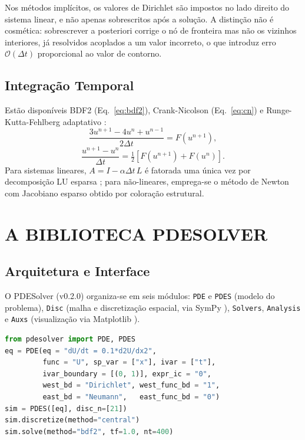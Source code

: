 \documentclass[10pt,brazil,english]{article}
\begin{document}
Nos métodos implícitos, os valores de Dirichlet são impostos no lado direito do sistema linear, e não apenas sobrescritos após a solução. A distinção não é cosmética: sobrescrever a posteriori corrige o nó de fronteira mas não os vizinhos interiores, já resolvidos acoplados a um valor incorreto, o que introduz erro $\mathcal{O}(\Delta t)$ proporcional ao valor de contorno.

\subsection{Integração Temporal}

Estão disponíveis BDF2 (Eq.~\ref{eq:bdf2}), Crank-Nicolson (Eq.~\ref{eq:cn}) e Runge-Kutta-Fehlberg adaptativo \cite{fehlberg1969}:
\begin{equation}
  \frac{3u^{n+1} - 4u^n + u^{n-1}}{2\Delta t} = F(u^{n+1}),
  \label{eq:bdf2}
\end{equation}
\begin{equation}
  \frac{u^{n+1} - u^n}{\Delta t} = \tfrac{1}{2}\left[F(u^{n+1}) + F(u^n)\right].
  \label{eq:cn}
\end{equation}
Para sistemas lineares, $A = I - \alpha \Delta t\, L$ é fatorada uma única vez por decomposição LU esparsa \cite{SciPy2020}; para não-lineares, emprega-se o método de Newton com Jacobiano esparso obtido por coloração estrutural.

\section{A BIBLIOTECA PDESOLVER}

\subsection{Arquitetura e Interface}

O PDESolver (v0.2.0) organiza-se em seis módulos: \texttt{PDE} e \texttt{PDES} (modelo do problema), \texttt{Disc} (malha e discretização espacial, via SymPy \cite{meurer2017}), \texttt{Solvers}, \texttt{Analysis} e \texttt{Auxs} (visualização via Matplotlib \cite{hunter2007}).

\begin{lstlisting}[float=htb, showstringspaces=false, language=Python]
from pdesolver import PDE, PDES
eq = PDE(eq = "dU/dt = 0.1*d2U/dx2",
         func = "U", sp_var = ["x"], ivar = ["t"],
         ivar_boundary = [(0, 1)], expr_ic = "0",
         west_bd = "Dirichlet", west_func_bd = "1",
         east_bd = "Neumann",   east_func_bd = "0")
sim = PDES([eq], disc_n=[21])
sim.discretize(method="central")
sim.solve(method="bdf2", tf=1.0, nt=400)
\end{lstlisting}
\end{document}
